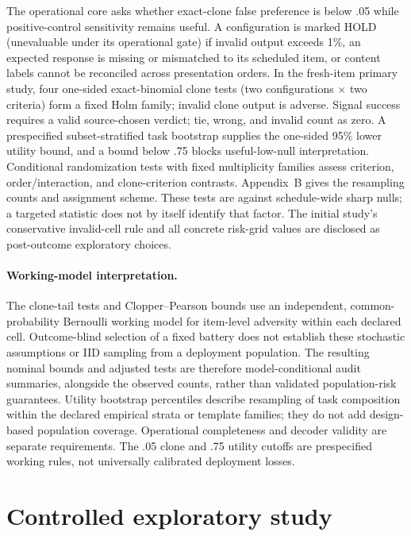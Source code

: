 \documentclass[10pt]{article}
\begin{document}
The operational core asks whether exact-clone false preference is below .05 while positive-control sensitivity remains useful. A configuration is marked HOLD (unevaluable under its operational gate) if invalid output exceeds 1\%, an expected response is missing or mismatched to its scheduled item, or content labels cannot be reconciled across presentation orders. In the fresh-item primary study, four one-sided exact-binomial clone tests (two configurations $\times$ two criteria) form a fixed Holm family; invalid clone output is adverse. Signal success requires a valid source-chosen verdict; tie, wrong, and invalid count as zero. A prespecified subset-stratified task bootstrap supplies the one-sided 95\% lower utility bound, and a bound below .75 blocks useful-low-null interpretation. Conditional randomization tests with fixed multiplicity families assess criterion, order/interaction, and clone-criterion contrasts. Appendix~B gives the resampling counts and assignment scheme. These tests are against schedule-wide sharp nulls; a targeted statistic does not by itself identify that factor. The initial study's conservative invalid-cell rule and all concrete risk-grid values are disclosed as post-outcome exploratory choices.

\paragraph{Working-model interpretation.}
\label{sec:working-model}
The clone-tail tests and Clopper--Pearson bounds use an independent, common-probability Bernoulli working model for item-level adversity within each declared cell. Outcome-blind selection of a fixed battery does not establish these stochastic assumptions or IID sampling from a deployment population. The resulting nominal bounds and adjusted tests are therefore model-conditional audit summaries, alongside the observed counts, rather than validated population-risk guarantees. Utility bootstrap percentiles describe resampling of task composition within the declared empirical strata or template families; they do not add design-based population coverage. Operational completeness and decoder validity are separate requirements. The .05 clone and .75 utility cutoffs are prespecified working rules, not universally calibrated deployment losses.

\section{Controlled exploratory study}
\end{document}
